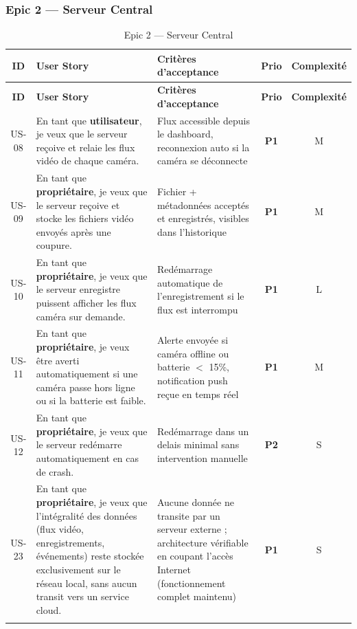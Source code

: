 \documentclass[12pt,a4paper]{article}
\begin{document}
\subsubsection{Epic 2 --- Serveur Central}

\begin{longtable}{|c|p{3.8cm}|p{6.3cm}|c|c|}
\hline
\textbf{ID} & \textbf{User Story} & \textbf{Critères d'acceptance} & \textbf{Prio} & \textbf{Complexité} \\
\hline
\endfirsthead
\hline
\textbf{ID} & \textbf{User Story} & \textbf{Critères d'acceptance} & \textbf{Prio} & \textbf{Complexité} \\
\hline
\endhead
US-08 & En tant que \textbf{utilisateur}, je veux que le serveur reçoive et relaie les flux vidéo de chaque caméra. & Flux accessible depuis le dashboard, reconnexion auto si la caméra se déconnecte & \textbf{P1} & M \\
\hline
US-09 & En tant que \textbf{propriétaire}, je veux que le serveur reçoive et stocke les fichiers vidéo envoyés après une coupure. & Fichier + métadonnées acceptés et enregistrés, visibles dans l'historique & \textbf{P1} & M \\
\hline
US-10 & En tant que \textbf{propriétaire}, je veux que le serveur enregistre puissent afficher les flux caméra sur demande. & Redémarrage automatique de l'enregistrement si le flux est interrompu & \textbf{P1} & L \\
\hline
US-11 & En tant que \textbf{propriétaire}, je veux être averti automatiquement si une caméra passe hors ligne ou si la batterie est faible. & Alerte envoyée si caméra offline ou batterie $<$ 15\%, notification push reçue en temps réel & \textbf{P1} & M \\
\hline
US-12 & En tant que \textbf{propriétaire}, je veux que le serveur redémarre automatiquement en cas de crash. & Redémarrage dans un delais minimal sans intervention manuelle & \textbf{P2} & S \\
\hline
US-23 & En tant que \textbf{propriétaire}, je veux que l'intégralité des données (flux vidéo, enregistrements, événements) reste stockée exclusivement sur le réseau local, sans aucun transit vers un service cloud. & Aucune donnée ne transite par un serveur externe ; architecture vérifiable en coupant l'accès Internet (fonctionnement complet maintenu) & \textbf{P1} & S \\
\hline
\caption{Epic 2 --- Serveur Central}
\end{longtable}
\end{document}

